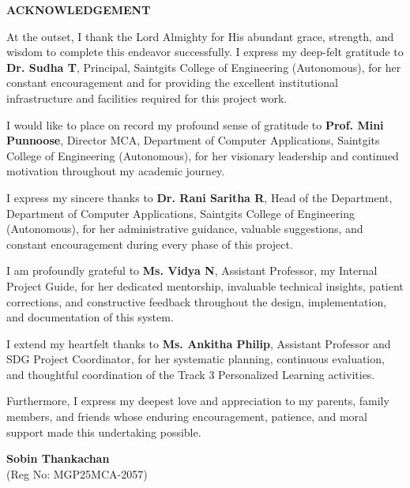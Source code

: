 \documentclass[12pt,a4paper]{report}
\begin{document}
\newpage
\thispagestyle{empty}
\begin{center}
\fontsize{16pt}{18pt}\selectfont
\textbf{ACKNOWLEDGEMENT}
\end{center}
\vspace{0.8cm}
At the outset, I thank the Lord Almighty for His abundant grace, strength, and wisdom to complete this endeavor successfully. I express my deep-felt gratitude to \textbf{Dr. Sudha T}, Principal, Saintgits College of Engineering (Autonomous), for her constant encouragement and for providing the excellent institutional infrastructure and facilities required for this project work.

I would like to place on record my profound sense of gratitude to \textbf{Prof. Mini Punnoose}, Director MCA, Department of Computer Applications, Saintgits College of Engineering (Autonomous), for her visionary leadership and continued motivation throughout my academic journey.

I express my sincere thanks to \textbf{Dr. Rani Saritha R}, Head of the Department, Department of Computer Applications, Saintgits College of Engineering (Autonomous), for her administrative guidance, valuable suggestions, and constant encouragement during every phase of this project.

I am profoundly grateful to \textbf{Ms. Vidya N}, Assistant Professor, my Internal Project Guide, for her dedicated mentorship, invaluable technical insights, patient corrections, and constructive feedback throughout the design, implementation, and documentation of this system.

I extend my heartfelt thanks to \textbf{Ms. Ankitha Philip}, Assistant Professor and SDG Project Coordinator, for her systematic planning, continuous evaluation, and thoughtful coordination of the Track 3 Personalized Learning activities.

Furthermore, I express my deepest love and appreciation to my parents, family members, and friends whose enduring encouragement, patience, and moral support made this undertaking possible.
\vspace{1.8cm}
\begin{flushright}
\textbf{Sobin Thankachan}\\
(Reg No: MGP25MCA-2057)
\end{flushright}
\end{document}
